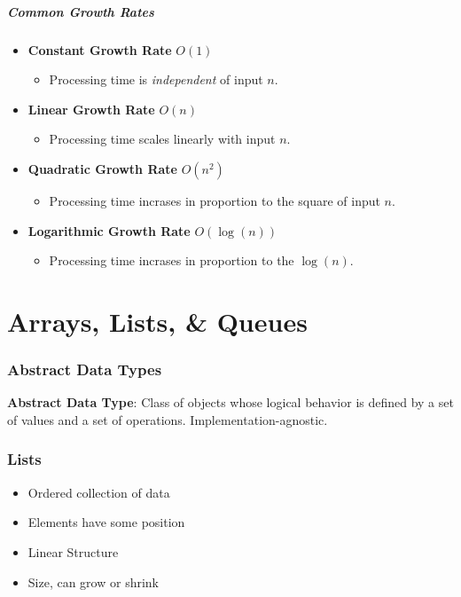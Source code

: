 \documentclass[12pt, letterpaper]{article}
\begin{document}
\subsubsection*{Common Growth Rates}
\begin{itemize}
    \item \textbf{Constant Growth Rate} $ O(1) $
        \begin{itemize}
            \item Processing time is \textit{independent} of input $ n $.
        \end{itemize}
    \item \textbf{Linear Growth Rate} $ O(n) $
        \begin{itemize}
            \item Processing time scales linearly with input $ n $.
        \end{itemize}
    \item \textbf{Quadratic Growth Rate} $ O(n^2) $
        \begin{itemize}
            \item Processing time incrases in proportion to the square of input $ n $.
        \end{itemize}
    \item \textbf{Logarithmic Growth Rate} $ O(\log(n)) $
        \begin{itemize}
            \item Processing time incrases in proportion to the $ \log(n) $.
        \end{itemize}
\end{itemize}

\part{Arrays, Lists, \& Queues}

\section*{Abstract Data Types}

\textbf{Abstract Data Type}: Class of objects whose logical behavior is defined by a set of values and a set of operations. Implementation-agnostic.

\section*{Lists}

\begin{itemize}
    \item Ordered collection of data
    \item Elements have some position
    \item Linear Structure
    \item Size, can grow or shrink
\end{itemize}
\end{document}
